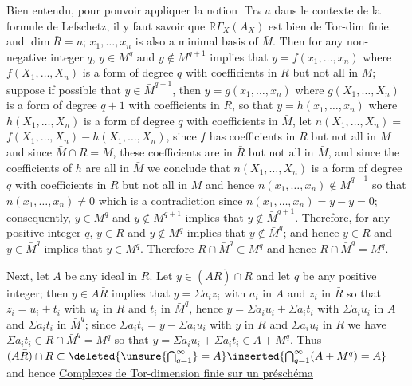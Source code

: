 Bien entendu, pour pouvoir appliquer la notion
$\operatorname{Tr}_*u$ dans le contexte de la formule de Lefschetz, il y
faut savoir que $\mathbb R\Gamma_X(A_X)$ est bien  de Tor-dim finie.
and $\dim\bar R=n$; $x_1,\ldots,x_n$ is also a minimal basis of $\bar M$. Then
for any non-negative integer $q$, $y\in M^q$ and $y\notin M^{q+1}$ implies
that $y=f(x_1,\ldots,x_n)$ where $f(X_1,\ldots,X_n)$ is a form of
degree $q$ with coefficients in $R$ but not all in $M$; suppose if
possible that $y\in\bar M^{q+1}$, then $y=g(x_1,\ldots,x_n)$ where
$g(X_1,\ldots,X_n)$ is a form of degree $q+1$ with coefficients in
$\bar R$, so that $y=h(x_1,\ldots,x_n)$ where $h(X_1,\ldots,X_n)$ is a form
of degree $q$ with coefficients in $\bar M$, let $n(X_1,\ldots,X_n)=$
$f(X_1,\ldots,X_n)-h(X_1,\ldots,X_n)$, since $f$ has coefficients in $R$
but not all in $M$ and since $\bar M\cap R=M$, these coefficients are
in $\bar R$ but not all in $\bar M$, and since the coefficients of $h$ are
all in $\bar M$ we conclude that $n(X_1,\ldots,X_n)$ is a form of degree
$q$ with coefficients in $\bar R$ but not all in $\bar M$ and hence
$n(x_1,\ldots,x_n)\notin\bar M^{q+1}$ so that $n(x_1,\ldots,x_n)\ne0$ which is a
contradiction since $n(x_1,\ldots,x_n)=y-y=0$; consequently,
$y\in M^q$ and $y\notin M^{q+1}$ implies that $y\notin\bar M^{q+1}$. Therefore, for
any positive integer $q$, $y\in R$ and $y\notin M^q$ implies that $y\notin\bar M^q$;
and hence $y\in R$ and $y\in\bar M^q$ implies that $y\in M^q$. Therefore
$R\cap\bar M^q\subset M^q$ and hence $R\cap\bar M^q=M^q$.

Next, let $A$ be any ideal in $R$. Let $y\in(A\bar R)\cap R$ and let
$q$ be any positive integer; then $y\in A\bar R$ implies that $y=\Sigma a_i z_i$
with $a_i$ in $A$ and $z_i$ in $\bar R$ so that $z_i=u_i+t_i$ with $u_i$
in $R$ and $t_i$ in $\bar M^q$, hence $y=\Sigma a_i u_i+\Sigma a_i t_i$ with $\Sigma a_i u_i$ in
$A$ and $\Sigma a_i t_i$ in $\bar M^q$; since $\Sigma a_i t_i=y-\Sigma a_i u_i$ with $y$ in $R$
and $\Sigma a_i u_i$ in $R$ we have $\Sigma a_i t_i\in R\cap\bar M^q=M^q$ so that
$y=\Sigma a_i u_i+\Sigma a_i t_i\in A+M^q$. Thus $(A\bar R)\cap R\subset\deleted{\unsure{\bigcap_{q=1}^{\infty}}=A}\inserted{\bigcap_{q=1}^{\infty}(A+M^q)=A}$ and hence
\uline{Complexes de Tor-dimension finie sur un préschéma}

